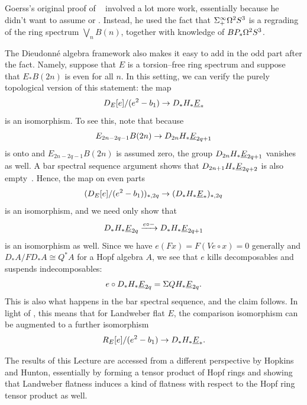 \begin{remark}
Goerss's original proof of ~\cite{GoerssDieudonne} involved a lot more work, essentially because he didn't want to assume  or .
Instead, he used the fact that \(\Sigma^\infty_+ \Omega^2 S^3\) is a regrading of the ring spectrum \(\bigvee_n B(n)\), together with knowledge of \(BP_* \Omega^2 S^3\).
\end{remark}

\begin{remark}
The Dieudonn\'e algebra framework also makes it easy to add in the odd part after the fact.
Namely, suppose that \(E\) is a torsion--free ring spectrum and suppose that \(E_* B(2n)\) is even for all \(n\).
In this setting, we can verify the purely topological version of this statement: the map \[D_E[e] / (e^2 - b_1) \to D_* H_* \OS{E}{*}\] is an isomorphism.
To see this, note that because \[E_{2n-2q-1} B(2n) \to D_{2n} H_* \OS{E}{2q+1}\] is onto and \(E_{2n-2q-1} B(2n)\) is assumed zero, the group \(D_{2n} H_* \OS{E}{2q+1}\) vanishes as well.
A bar spectral sequence argument shows that \(D_{2n+1} H_* \OS{E}{2q+2}\) is also empty~\cite[Lemma 11.5.1]{GoerssDieudonne}.
Hence, the map on even parts \[(D_E[e] / (e^2 - b_1))_{*, 2q} \to (D_* H_* \OS{E}{*})_{*, 2q}\] is an isomorphism, and we need only show that \[D_* H_* \OS{E}{2q} \xrightarrow{e \circ -} D_* H_* \OS{E}{2q+1}\] is an isomorphism as well.
Since we have \(e(Fx) = F(Ve \circ x) = 0\) generally and \(D_* A / FD_* A \cong Q^* A\) for a Hopf algebra \(A\), we see that \(e\) kills decomposables and suspends indecomposables: \[e \circ D_* H_* \OS{E}{2q} = \Susp QH_* \OS{E}{2q}.\]
This is also what happens in the bar spectral sequence, and the claim follows.
In light of , this means that for Landweber flat \(E\), the comparison isomorphism can be augmented to a further isomorphism \[R_E[e] / (e^2 - b_1) \to D_* H_* \OS{E}{*}.\]
\end{remark}

\begin{remark}
The results of this Lecture are accessed from a different perspective by Hopkins and Hunton, essentially by forming a tensor product of Hopf rings and showing that Landweber flatness induces a kind of flatness with respect to the Hopf ring tensor product as well.
\end{remark}


